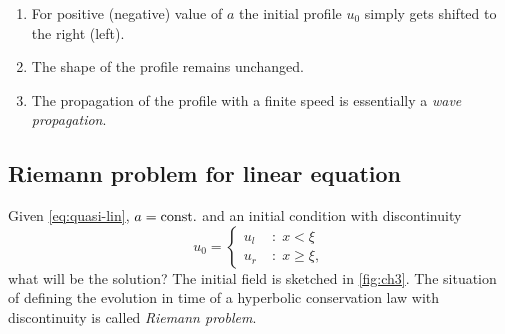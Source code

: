 \documentclass[justified, nobib, a4page]{tufte-handout}
\begin{document}
\begin{enumerate}
  \item For positive (negative) value of \(a\) the initial profile \(u_0\)
    simply gets shifted to the right (left).
  \item The shape of the profile remains unchanged.
  \item The propagation of the profile with a finite speed is essentially 
    a \emph{wave propagation}.
\end{enumerate}

\subsection{Riemann problem for linear equation}
Given \cref{eq:quasi-lin}, \(a=\mathrm{const.}\) and an initial condition with 
discontinuity 
\[
u_0 = \left\{
\begin{aligned}
 u_l \; &: \; x < \xi\\
 u_r \; &: \; x \geq \xi,
\end{aligned} \right.
\]
what will be the solution? The initial field is sketched in \cref{fig:ch3}. The
situation of defining the evolution in time of a hyperbolic conservation law
with discontinuity is called \emph{Riemann problem}.

\begin{marginfigure}
  \begin{center}
  \end{center}
  \caption{Initial field for the Riemann problem example.}\label{fig:ch3}
\end{marginfigure}
\end{document}
